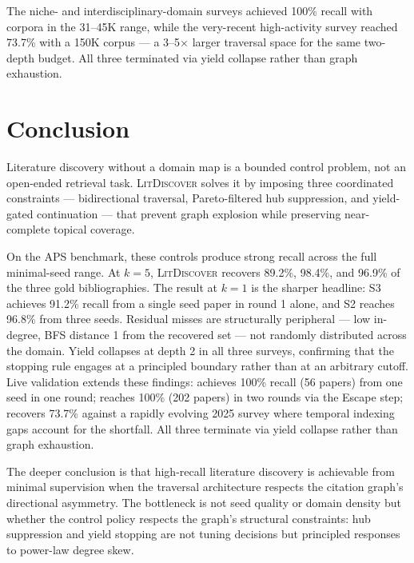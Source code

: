 \documentclass[manuscript,review,anonymous]{acmart}
\newcommand{\ldiscover}{\textsc{LitDiscover}}
\begin{document}
The niche- and interdisciplinary-domain surveys achieved 100\% recall with corpora in the
31--45K range, while the very-recent high-activity survey reached 73.7\% with a 150K corpus
--- a 3--5$\times$ larger traversal space for the same two-depth budget. All three terminated
via yield collapse rather than graph exhaustion.

\section{Conclusion}

Literature discovery without a domain map is a bounded control problem, not an open-ended
retrieval task. \ldiscover{} solves it by imposing three coordinated constraints
--- bidirectional traversal, Pareto-filtered hub suppression, and yield-gated continuation
--- that prevent graph explosion while preserving near-complete topical coverage.

On the APS benchmark, these controls produce strong recall across the full minimal-seed
range. At $k = 5$, \ldiscover{} recovers 89.2\%, 98.4\%, and 96.9\% of the three gold
bibliographies. The result at $k = 1$ is the sharper headline: S3 achieves 91.2\% recall
from a single seed paper in round 1 alone, and S2 reaches 96.8\% from three seeds.
Residual misses are structurally peripheral --- low in-degree, BFS distance 1 from the
recovered set --- not randomly distributed across the domain. Yield collapses at depth 2
in all three surveys, confirming that the stopping rule engages at a principled boundary
rather than at an arbitrary cutoff. Live validation extends these findings:
\citet{Bobrowski2018} achieves 100\% recall (56 papers) from one seed in one round;
\citet{Galesic2021} reaches 100\% (202 papers) in two rounds via the Escape step;
\citet{Liu2025} recovers 73.7\% against a rapidly evolving 2025 survey where temporal
indexing gaps account for the shortfall. All three terminate via yield collapse rather
than graph exhaustion.

The deeper conclusion is that high-recall literature discovery is achievable from minimal
supervision when the traversal architecture respects the citation graph's directional
asymmetry. The bottleneck is not seed quality or domain density but whether the control
policy respects the graph's structural constraints: hub suppression and yield stopping are
not tuning decisions but principled responses to power-law degree skew.
\end{document}
